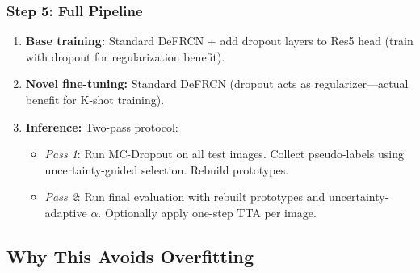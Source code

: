 \documentclass[11pt,a4paper]{article}
\begin{document}
\subsubsection{Step 5: Full Pipeline}

\begin{enumerate}[nosep]
    \item \textbf{Base training:} Standard DeFRCN + add dropout layers to Res5 head (train with dropout for regularization benefit).
    \item \textbf{Novel fine-tuning:} Standard DeFRCN (dropout acts as regularizer---actual benefit for K-shot training).
    \item \textbf{Inference:} Two-pass protocol:
    \begin{itemize}[nosep]
        \item \textit{Pass 1}: Run MC-Dropout on all test images. Collect pseudo-labels using uncertainty-guided selection. Rebuild prototypes.
        \item \textit{Pass 2}: Run final evaluation with rebuilt prototypes and uncertainty-adaptive $\alpha$. Optionally apply one-step TTA per image.
    \end{itemize}
\end{enumerate}

\subsection{Why This Avoids Overfitting}
\end{document}
